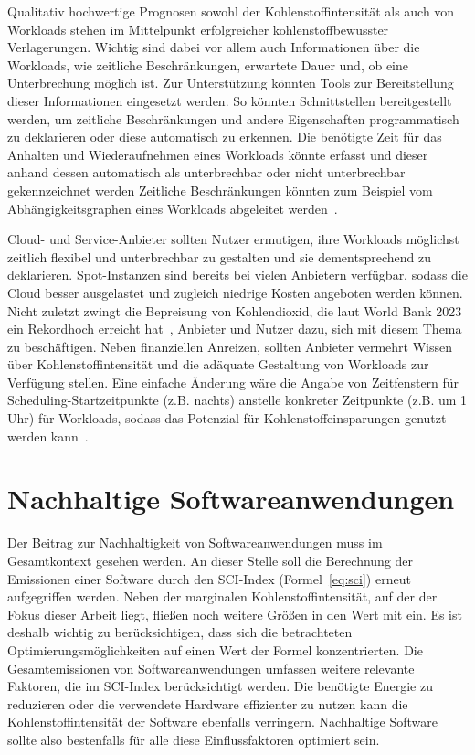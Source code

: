 Qualitativ hochwertige Prognosen sowohl der Kohlenstoffintensität als auch von Workloads stehen im Mittelpunkt erfolgreicher kohlenstoffbewusster Verlagerungen.
Wichtig sind dabei vor allem auch Informationen über die Workloads, wie zeitliche Beschränkungen, erwartete Dauer und, ob eine Unterbrechung möglich ist.
Zur Unterstützung könnten Tools zur Bereitstellung dieser Informationen eingesetzt werden.
So könnten Schnittstellen bereitgestellt werden, um zeitliche Beschränkungen und andere Eigenschaften programmatisch zu deklarieren oder diese automatisch zu erkennen.
Die benötigte Zeit für das Anhalten und Wiederaufnehmen eines Workloads könnte erfasst und dieser anhand dessen automatisch als unterbrechbar oder nicht unterbrechbar gekennzeichnet werden
Zeitliche Beschränkungen könnten zum Beispiel vom Abhängigkeitsgraphen eines Workloads abgeleitet werden~\cite{Wiesner.2021}.

Cloud- und Service-Anbieter sollten Nutzer ermutigen, ihre Workloads möglichst zeitlich flexibel und unterbrechbar zu gestalten und sie dementsprechend zu deklarieren.
Spot-Instanzen sind bereits bei vielen Anbietern verfügbar, sodass die Cloud besser ausgelastet und zugleich niedrige Kosten angeboten werden können.
Nicht zuletzt zwingt die Bepreisung von Kohlendioxid, die laut World Bank 2023 ein Rekordhoch erreicht hat~\cite{WorldBank.2023}, Anbieter und Nutzer dazu, sich mit diesem Thema zu beschäftigen.
Neben finanziellen Anreizen, sollten Anbieter vermehrt Wissen über Kohlenstoffintensität und die adäquate Gestaltung von Workloads zur Verfügung stellen.
Eine einfache Änderung wäre die Angabe von Zeitfenstern für Scheduling-Startzeitpunkte (z.B. nachts) anstelle konkreter Zeitpunkte (z.B. um 1 Uhr) für Workloads, sodass das Potenzial für Kohlenstoffeinsparungen genutzt werden kann~\cite{Wiesner.2021}.

\section{Nachhaltige Softwareanwendungen}
Der Beitrag zur Nachhaltigkeit von Softwareanwendungen muss im Gesamtkontext gesehen werden.
An dieser Stelle soll die Berechnung der Emissionen einer Software durch den \ac{SCI}-Index (Formel~\ref{eq:sci}) erneut aufgegriffen werden.
Neben der marginalen Kohlenstoffintensität, auf der der Fokus dieser Arbeit liegt, fließen noch weitere Größen in den Wert mit ein.
Es ist deshalb wichtig zu berücksichtigen, dass sich die betrachteten Optimierungsmöglichkeiten auf einen Wert der Formel konzentrierten.
Die Gesamtemissionen von Softwareanwendungen umfassen weitere relevante Faktoren, die im \ac{SCI}-Index berücksichtigt werden.
Die benötigte Energie zu reduzieren oder die verwendete Hardware effizienter zu nutzen kann die Kohlenstoffintensität der Software ebenfalls verringern.
Nachhaltige Software sollte also bestenfalls für alle diese Einflussfaktoren optimiert sein.

